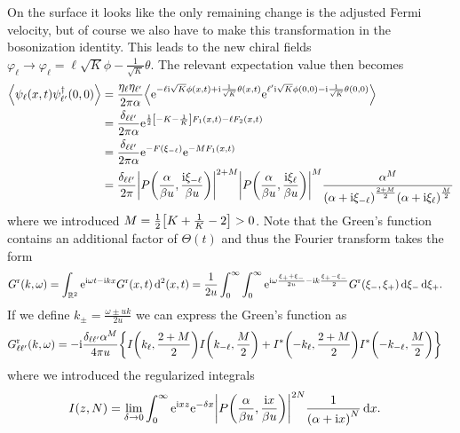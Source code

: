 \documentclass[english, parskip=full]{scrartcl}
\begin{document}
On the surface it looks like the only remaining change is the adjusted Fermi velocity, but of course we also have to make this transformation in the bosonization identity.
This leads to the new chiral fields $\varphi_\ell \rightarrow \varphi_\ell = \ell \sqrt{K} \phi - \frac{1}{\sqrt{K}} \theta$.
The relevant expectation value then becomes
\begin{align}
\bra*{\psi_\ell(x,t)\psi_{\ell'}^\dagger(0,0)} &= \frac{\eta_\ell\eta_{\ell'}}{2\pi\alpha} \bra*{\powe{-\ell \i\sqrt{K}\phi(x,t) + \i \frac{1}{\sqrt{K}} \theta(x,t)} \powe{\ell'\i\sqrt{K} \phi(0,0) - \i \frac{1}{\sqrt{K}} \theta(0,0)}}\\
&= \frac{\delta_{\ell\ell'}}{2\pi\alpha} \powe{\frac{1}{2} \klb*{-K - \frac{1}{K}} F_1(x,t) - \ell F_2(x,t)}\\
&= \frac{\delta_{\ell\ell'}}{2\pi\alpha} \powe{-F(\xi_{-\ell})} \powe{-MF_1(x,t)}\\
&= \frac{\delta_{\ell\ell'}}{2\pi} \abs*{P\kla*{\frac{\alpha}{\beta u}, \frac{\i\xi_{-\ell}}{\beta u}}}^{2+M} \abs*{P\kla*{\frac{\alpha}{\beta u}, \frac{\i\xi_{\ell}}{\beta u}}}^M \frac{\alpha^M}{\kla*{\alpha + \i\xi_{-\ell}}^{\frac{2+M}{2}} \kla*{\alpha + \i\xi_\ell}^\frac{M}{2}}
\end{align}
where we introduced $M = \frac{1}{2} \klb*{K + \frac{1}{K} - 2} > 0$.
Note that the Green's function contains an additional factor of $\Theta(t)$ and thus the Fourier transform takes the form
\begin{align}
G^{\text{r}}(k,\omega) &= \int_{\mathbb{R}^{2}} \text{e}^{\text{i}\omega t - \text{i} kx} G^{\text{r}}(x,t) \, \mathrm{d}^{2}(x,t) = \frac{1}{2u} \int_{0}^{\infty} \int_{0}^{\infty} \text{e}^{\text{i}\omega \frac{\xi_+ + \xi_-}{2u} - \text{i} k\frac{\xi_+ - \xi_-}{2}} G^{\text{r}}(\xi_-,\xi_+) \,\mathrm{d}\xi_- \,\mathrm{d}\xi_+.
\end{align}
If we define $k_\pm = \frac{\omega \pm uk}{2u}$ we can express the Green's function as
\begin{align}
G_{\ell\ell'}^\r(k,\omega) &= -\i\frac{\delta_{\ell\ell'} \alpha^M}{4\pi u} \klc*{I\kla*{k_\ell, \frac{2+M}{2}} I\kla*{k_{-\ell}, \frac{M}{2}} + I^\ast\kla*{-k_\ell, \frac{2+M}{2}} I^\ast\kla*{-k_{-\ell}, \frac{M}{2}}}
\end{align}
where we introduced the regularized integrals
\begin{align}
I(z,N) &= \lim_{\delta\rightarrow 0} \intx{0}{\infty}{\powe{\i x z} \powe{-\delta x} \abs*{P\kla*{\frac{\alpha}{\beta u}, \frac{\i x}{\beta u}}}^{2N} \frac{1}{\kla*{\alpha + \i x}^N}}{x}.
\end{align}
\end{document}
